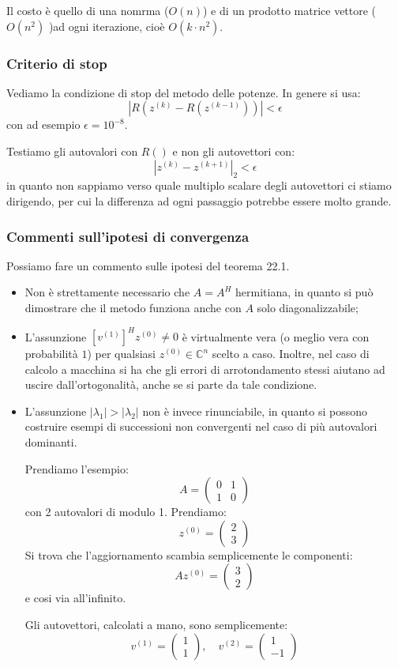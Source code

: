 \documentclass[a4paper,11pt]{article}
\begin{document}
Il costo è quello di una nomrma ($O(n)$) e di un prodotto matrice vettore ($O(n^2)$ )ad ogni iterazione, cioè $O(k \cdot n^2)$.

\subsubsection{Criterio di stop}
Vediamo la condizione di stop del metodo delle potenze.
In genere si usa:
$$
|R(z^{(k)} - R(z^{(k - 1)}))| < \epsilon
$$
con ad esempio $\epsilon = 10^{-8}$.

Testiamo gli autovalori con $R()$ e non gli autovettori con:
$$
|z^{(k)} - z^{(k + 1)}|_2 < \epsilon
$$
in quanto non sappiamo verso quale multiplo scalare degli autovettori ci stiamo dirigendo, per cui la differenza ad ogni passaggio potrebbe essere molto grande.

\subsubsection{Commenti sull'ipotesi di convergenza}
Possiamo fare un commento sulle ipotesi del teorema 22.1.
\begin{itemize}
	\item Non è strettamente necessario che $A = A^H$ hermitiana, in quanto si può dimostrare che il metodo funziona anche con $A$ solo diagonalizzabile;
	\item L'assunzione $\left[ v^{(1)} \right]^H z^{(0)} \neq 0$ è virtualmente vera (o meglio vera con probabilità $1$) per qualsiasi $z^{(0)} \in \mathbb{C}^n$ scelto a caso.
		Inoltre, nel caso di calcolo a macchina si ha che gli errori di arrotondamento stessi aiutano ad uscire dall'ortogonalità, anche se si parte da tale condizione.
		\item L'assunzione $|\lambda_1| > |\lambda_2|$ non è invece rinunciabile, in quanto si possono costruire esempi di successioni non convergenti nel caso di più autovalori dominanti.

			Prendiamo l'esempio:
			$$
				A =
				\begin{pmatrix}
					0 & 1 \\ 
					1 & 0
				\end{pmatrix}
			$$
			con 2 autovalori di modulo 1.
			Prendiamo:
			$$
			z^{(0)} = 
			\begin{pmatrix}
				2 \\ 3
			\end{pmatrix}
			$$
			Si trova che l'aggiornamento scambia semplicemente le componenti:
			$$
			A z^{(0)} =
			\begin{pmatrix}
				3 \\ 2
			\end{pmatrix}
			$$
			e cosi via all'infinito.

			Gli autovettori, calcolati a mano, sono semplicemente:
			$$
				v^{(1)} =
				\begin{pmatrix}
					1 \\ 1
				\end{pmatrix}, \quad
				v^{(2)} =
				\begin{pmatrix}
					1 \\ -1
				\end{pmatrix}
			$$
\end{itemize}
\end{document}
